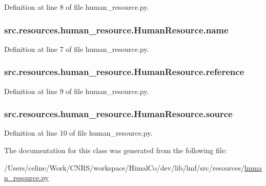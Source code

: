 Definition at line 8 of file human\+\_\+resource.\+py.

\hypertarget{classsrc_1_1resources_1_1human__resource_1_1_human_resource_a73511a367ec14498cacc3fdb0cc77b22}{
\subsubsection[{name}]{\setlength{\rightskip}{0pt plus 5cm}src.\+resources.\+human\+\_\+resource.\+Human\+Resource.\+name}}\label{classsrc_1_1resources_1_1human__resource_1_1_human_resource_a73511a367ec14498cacc3fdb0cc77b22}


Definition at line 7 of file human\+\_\+resource.\+py.

\hypertarget{classsrc_1_1resources_1_1human__resource_1_1_human_resource_a78c9919983d0f23160d8fe45732f139d}{
\subsubsection[{reference}]{\setlength{\rightskip}{0pt plus 5cm}src.\+resources.\+human\+\_\+resource.\+Human\+Resource.\+reference}}\label{classsrc_1_1resources_1_1human__resource_1_1_human_resource_a78c9919983d0f23160d8fe45732f139d}


Definition at line 9 of file human\+\_\+resource.\+py.

\hypertarget{classsrc_1_1resources_1_1human__resource_1_1_human_resource_af7a5b2ee569964a16652fc96298ea6bd}{
\subsubsection[{source}]{\setlength{\rightskip}{0pt plus 5cm}src.\+resources.\+human\+\_\+resource.\+Human\+Resource.\+source}}\label{classsrc_1_1resources_1_1human__resource_1_1_human_resource_af7a5b2ee569964a16652fc96298ea6bd}


Definition at line 10 of file human\+\_\+resource.\+py.



The documentation for this class was generated from the following file\+:\begin{DoxyCompactItemize}
\item 
/\+Users/celine/\+Work/\+C\+N\+R\+S/workspace/\+Himal\+Co/dev/lib/lmf/src/resources/\hyperlink{human__resource_8py}{human\+\_\+resource.\+py}\end{DoxyCompactItemize}
